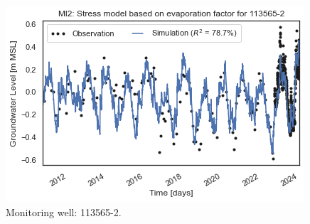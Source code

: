 \begin{figure}[htbp]
\begin{minipage}{0.32\textwidth}
        \includegraphics[width=\linewidth]{frontmatter/Rozenburg-fig/1135652(2)png.png}
        \caption{Monitoring well: 113565-2.}
        \label{fig:113565-2}
    \end{minipage}
\end{figure}
